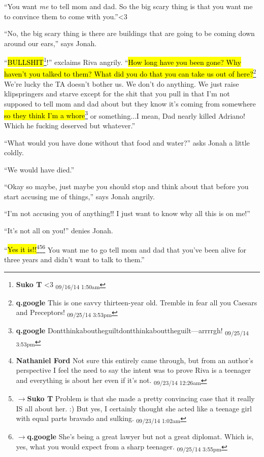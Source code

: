 ``You want \textit{me} to tell mom and dad.  So the big scary thing is that you want me to convince them to come with you.''\textless 3

``No, the big scary thing is there are buildings that are going to be coming down around our ears,'' says Jonah.

``\hl{BULLSHIT}\footnote{\textbf{Suko T }\textless 3 \textsubscript{09/16/14 1:50am}}!'' exclaims Riva angrily.  ``\hl{How long have you been gone?  Why haven't you talked to them?  What did you do that you can take us out of here?}\footnote{\textbf{q.google }This is one savvy thirteen-year old.  Tremble in fear all you Caesars and Preceptors! \textsubscript{09/25/14 3:53pm}}  We're lucky the TA doesn't bother us.  We don't do anything.   We just raise klipspringers and starve except for the shit that you pull in that I'm not supposed to tell mom and dad about but they know it's coming from somewhere \hl{so they think I'm a whore}\footnote{\textbf{q.google }Dontthinkaboutheguiltdontthinkabouttheguilt---arrrrgh! \textsubscript{09/25/14 3:53pm}} or something...I mean, Dad nearly killed Adriano!  Which he fucking deserved but whatever.''

``What would you have done without that food and water?'' asks Jonah a little coldly.

``We would have died.''

``Okay so maybe, just maybe you should stop and think about that before you start accusing me of things,'' says Jonah angrily.

``I'm not accusing you of anything!!  I just want to know why all this is on me!''

``It's not all on you!'' denies Jonah.

``\hl{Yes it is!!}\footnote{\textbf{Nathaniel Ford }Not sure this entirely came through, but from an author's perspective I feel the need to say the intent was to prove Riva is a teenager and everything is about her even if it's not. \textsubscript{09/23/14 12:26am}}\footnote{$\rightarrow$\textbf{Suko T }Problem is that she made a pretty convincing case that it really IS all about her. :)  But yes, I certainly thought she acted like a teenage girl with equal parts bravado and sulking. \textsubscript{09/23/14 1:02am}}\footnote{$\rightarrow$\textbf{q.google }She's being a great lawyer but not a great diplomat.  Which is, yes, what you would expect from a sharp teenager. \textsubscript{09/25/14 3:55pm}} You want me to go tell mom and dad that you've been alive for three years and didn't want to talk to them.''

